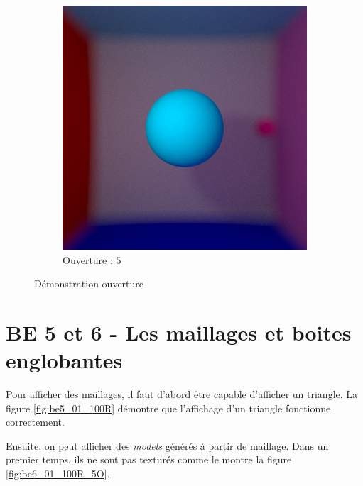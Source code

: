 \documentclass[12pt,a4paper,twoside]{report}
\begin{document}
\begin{figure}[H]
\begin{subfigure}{.45\textwidth}
		\includegraphics[width=1.\linewidth]{be4_02_1000_1_5}
		\caption{Ouverture : $5$}
		\label{fig:be4_02_1000_1_5}
	\end{subfigure}
	\caption{Démonstration ouverture}
	\label{fig:be4_02}
\end{figure}

\newpage\section{BE 5 et 6 - Les maillages et boites englobantes}

Pour afficher des maillages, il faut d'abord être capable d'afficher un triangle. La figure \ref{fig:be5_01_100R} démontre que l'affichage d'un triangle fonctionne correctement.

Ensuite, on peut afficher des \emph{models} générés à partir de maillage. Dans un premier temps, ils ne sont pas texturés comme le montre la figure \ref{fig:be6_01_100R_5O}.
\end{document}
